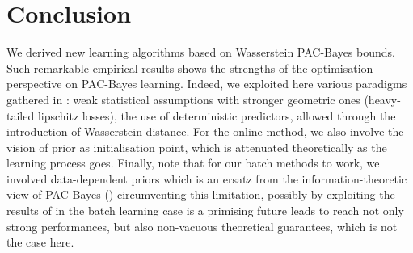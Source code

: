 \section{Conclusion}

We derived new learning algorithms based on Wasserstein PAC-Bayes bounds. Such remarkable empirical results shows the strengths of the optimisation perspective on PAC-Bayes learning. Indeed, we exploited here various paradigms gathered in : weak statistical assumptions with stronger geometric ones (heavy-tailed lipschitz losses), the use of deterministic predictors, allowed through the introduction of Wasserstein distance. For the online method, we also involve the vision of prior as initialisation point, which is attenuated theoretically as the learning process goes. Finally, note that for our batch methods to work, we involved data-dependent priors which is an ersatz from the information-theoretic view of PAC-Bayes () circumventing this limitation, possibly by exploiting the results of  in the batch learning case is a primising future leads to reach not only strong performances, but also non-vacuous theoretical guarantees, which is not the case here.  
